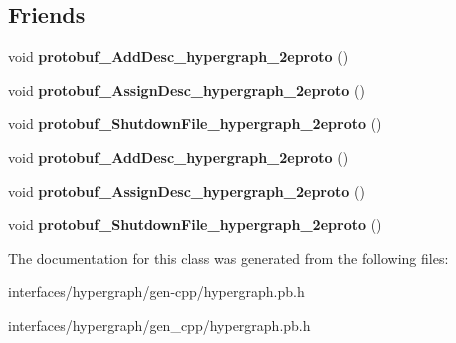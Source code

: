 \subsection*{Friends}
\begin{DoxyCompactItemize}
\item 
\hypertarget{classHypergraph__Node_aed4781a70bb54c95ce4bb1aa4f20b05c}{
void {\bfseries protobuf\_\-AddDesc\_\-hypergraph\_\-2eproto} ()}
\label{classHypergraph__Node_aed4781a70bb54c95ce4bb1aa4f20b05c}

\item 
\hypertarget{classHypergraph__Node_a3cbaa41d7f7b73db437c4e7d1edcb4f3}{
void {\bfseries protobuf\_\-AssignDesc\_\-hypergraph\_\-2eproto} ()}
\label{classHypergraph__Node_a3cbaa41d7f7b73db437c4e7d1edcb4f3}

\item 
\hypertarget{classHypergraph__Node_a424acd7e96228bbed0dba9436582d3c1}{
void {\bfseries protobuf\_\-ShutdownFile\_\-hypergraph\_\-2eproto} ()}
\label{classHypergraph__Node_a424acd7e96228bbed0dba9436582d3c1}

\item 
\hypertarget{classHypergraph__Node_aed4781a70bb54c95ce4bb1aa4f20b05c}{
void {\bfseries protobuf\_\-AddDesc\_\-hypergraph\_\-2eproto} ()}
\label{classHypergraph__Node_aed4781a70bb54c95ce4bb1aa4f20b05c}

\item 
\hypertarget{classHypergraph__Node_a3cbaa41d7f7b73db437c4e7d1edcb4f3}{
void {\bfseries protobuf\_\-AssignDesc\_\-hypergraph\_\-2eproto} ()}
\label{classHypergraph__Node_a3cbaa41d7f7b73db437c4e7d1edcb4f3}

\item 
\hypertarget{classHypergraph__Node_a424acd7e96228bbed0dba9436582d3c1}{
void {\bfseries protobuf\_\-ShutdownFile\_\-hypergraph\_\-2eproto} ()}
\label{classHypergraph__Node_a424acd7e96228bbed0dba9436582d3c1}

\end{DoxyCompactItemize}


The documentation for this class was generated from the following files:\begin{DoxyCompactItemize}
\item 
interfaces/hypergraph/gen-\/cpp/hypergraph.pb.h\item 
interfaces/hypergraph/gen\_\-cpp/hypergraph.pb.h\end{DoxyCompactItemize}
